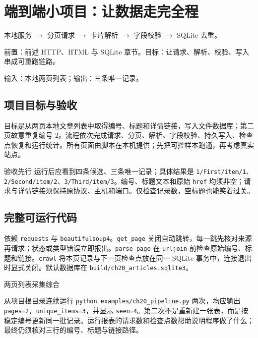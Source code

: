 \chapter{端到端小项目：让数据走完全程}\label{ch:project}
\begin{tcolorbox}[title=章首知识地图,colframe=Ink]
本地服务 $\longrightarrow$ 分页请求 $\longrightarrow$ 卡片解析 $\longrightarrow$ 字段校验 $\longrightarrow$ SQLite 去重。
\end{tcolorbox}

\begin{tcolorbox}[title=学习目标与前置知识,colframe=Ink!65,colback=Ink!2]
前置：前述 HTTP、HTML 与 SQLite 章节。目标：让请求、解析、校验、写入串成可重跑链路。\par
输入：本地两页列表；输出：三条唯一记录。
\end{tcolorbox}

\section{项目目标与验收}
目标是从两页本地文章列表中取得编号、标题和详情链接，写入文件数据库；第二页故意重复编号 2。流程依次完成请求、分页、解析、字段校验、持久写入、检查点恢复和运行统计。所有页面由脚本在本机提供；先把可控样本跑通，再考虑真实站点。

\begin{method}{验收先行}
运行后应看到四条候选、三条唯一记录；具体结果是 \texttt{1/First/item/1}、\texttt{2/Second/item/2}、\texttt{3/Third/item/3}。编号、标题文本和原始 \texttt{href} 均须非空；请求与详情链接须保持原协议、主机和端口。仅检查记录数，空标题也能笑着过关。
\end{method}

\section{完整可运行代码}
依赖 \texttt{requests} 与 \texttt{beautifulsoup4}。\texttt{get\_page} 关闭自动跳转，每一跳先核对来源再请求；状态或类型错误立即报出。\texttt{parse\_page} 在 \texttt{urljoin} 前检查原始编号、标题和链接。\texttt{crawl} 将本页记录与下一页检查点放在同一 SQLite 事务中，连接退出时显式关闭。默认数据库在 \texttt{build/ch20\_articles.sqlite3}。

\begin{example}{两页列表采集}{综合}
\end{example}

从项目根目录连续运行 \texttt{python examples/ch20\_pipeline.py} 两次，均应输出 \texttt{pages=2, unique\_items=3}，并显示 \texttt{seen=4}。第二次不是重新建一张表，而是按稳定编号更新同一批记录。运行报表的请求数和检查点数帮助说明程序做了什么；最终仍须核对三行的编号、标题与链接路径。

